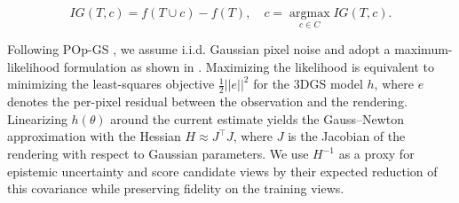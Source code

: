 {\small
\begin{equation}
IG(T,c) = f(T \cup c) - f(T), \quad c=\operatorname*{argmax}_{c \in C} IG(T,c).
\end{equation}
}

Following POp-GS \cite{wilson2025pop}, we assume i.i.d. Gaussian pixel noise and adopt a maximum-likelihood formulation as shown in . 
Maximizing the likelihood is equivalent to minimizing the least-squares objective $\frac{1}{2}||e||^{2}$ for the \ac{3DGS} model $h$, where $e$ denotes the per-pixel residual between the observation and the rendering.
Linearizing $h(\theta)$ around the current estimate yields the Gauss–Newton approximation with the Hessian $H \approx J^\top J$, where $J$ is the Jacobian of the rendering with respect to Gaussian parameters. We use $H^{-1}$ as a proxy for epistemic uncertainty and score candidate views by their expected reduction of this covariance while preserving fidelity on the training views.




